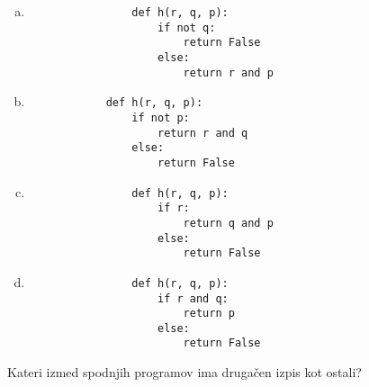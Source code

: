 \documentclass[arhiv, 10pt]{../izpit}
\begin{document}
        \begin{multicols}{2}
        \begin{enumerate}[(a)]
\item 
                \begin{verbatim}
                def h(r, q, p):
                    if not q:
                        return False
                    else:
                        return r and p
                \end{verbatim}
            
\item 
            \begin{verbatim}
            def h(r, q, p):
                if not p:
                    return r and q
                else:
                    return False
            \end{verbatim}
        
\item 
                \begin{verbatim}
                def h(r, q, p):
                    if r:
                        return q and p
                    else:
                        return False
                \end{verbatim}
            
\item 
                \begin{verbatim}
                def h(r, q, p):
                    if r and q:
                        return p
                    else:
                        return False
                \end{verbatim}
            
\end{enumerate}

        \end{multicols}
    
        \naloga*
        
        Kateri izmed spodnjih programov ima drugačen izpis kot ostali?
    
\end{document}
